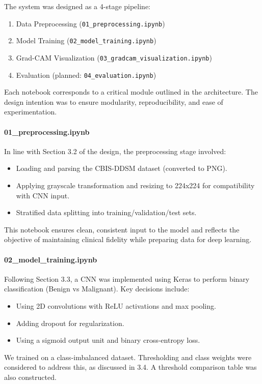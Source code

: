 \documentclass[12pt]{article}
\begin{document}
The system was designed as a 4-stage pipeline:
\begin{enumerate}
    \item Data Preprocessing (\texttt{01\_preprocessing.ipynb})
    \item Model Training (\texttt{02\_model\_training.ipynb})
    \item Grad-CAM Visualization (\texttt{03\_gradcam\_visualization.ipynb})
    \item Evaluation (planned: \texttt{04\_evaluation.ipynb})
\end{enumerate}

Each notebook corresponds to a critical module outlined in the architecture. The design intention was to ensure modularity, reproducibility, and ease of experimentation.

\paragraph{01\_preprocessing.ipynb}
In line with Section 3.2 of the design, the preprocessing stage involved:
\begin{itemize}
    \item Loading and parsing the CBIS-DDSM dataset (converted to PNG).
    \item Applying grayscale transformation and resizing to 224x224 for compatibility with CNN input.
    \item Stratified data splitting into training/validation/test sets.
\end{itemize}
This notebook ensures clean, consistent input to the model and reflects the objective of maintaining clinical fidelity while preparing data for deep learning.

\paragraph{02\_model\_training.ipynb}
Following Section 3.3, a CNN was implemented using Keras to perform binary classification (Benign vs Malignant). Key decisions include:
\begin{itemize}
    \item Using 2D convolutions with ReLU activations and max pooling.
    \item Adding dropout for regularization.
    \item Using a sigmoid output unit and binary cross-entropy loss.
\end{itemize}
We trained on a class-imbalanced dataset. Thresholding and class weights were considered to address this, as discussed in 3.4. A threshold comparison table was also constructed.
\end{document}
